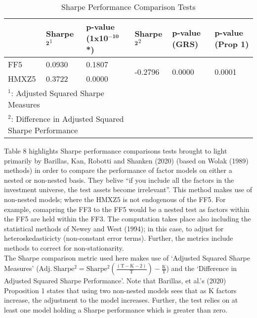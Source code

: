 \documentclass[11pt, english]{article}
\begin{document}
\begin{table}[h]
        \scriptsize
	\renewcommand{\arraystretch}{1.25}
\begin{center}
\begin{tabular}{ p{1.5cm} p{1.5cm} p{1.5cm} | p{1.5cm} p{1.5cm} p{1.5cm} }
        & \textbf{Sharpe}$\mathbf{^2}^1$ & \textbf{p-value (1x10$\mathbf{^{-10}}$*)} & \textbf{Sharpe}$\mathbf{^2}^2$ & \textbf{p-value (GRS)} & \textbf{p-value (Prop 1)}\\
        \hline
        FF5 & 0.0930 & 0.1807 & \multirow{2}{*}{-0.2796} & \multirow{2}{*}{0.0000} & \multirow{2}{*}{0.0001}\\
        HMXZ5 & 0.3722 & 0.0000 & & &\\
        \hline
        \multicolumn{3}{l}{$^1$: Adjusted Squared Sharpe Measures}\\
        \multicolumn{3}{l}{$^2$: Difference in Adjusted Squared Sharpe Performance}\\ 
        \hline
\end{tabular}
        \caption{Sharpe Performance Comparison Tests}
\end{center}
\end{table}

Table 8 highlights Sharpe performance comparisons tests brought to light primarily by Barillas, Kan, Robotti and Shanken (2020) (based on Wolak (1989) methods) in order to compare the performance of factor models on either a nested or non-nested basis. They belive ``if you include all the factors in the investment universe, the test assets become irrelevant''. This method makes use of non-nested models; where the HMXZ5 is not endogenous of the FF5. For example, comapring the FF3 to the FF5 would be a nested test as factors within the FF5 are held within the FF3. The computation takes place also including the statistical methods of Newey and West (1994); in this case, to adjust for heteroskedasticicty (non-constant error terms). Further, the metrics include methods to correct for non-stationarity.\\

The Sharpe comparison metric used here makes use of `Adjusted Squared Sharpe Measures' ($\mathrm{Adj.\ Sharpe^2=Sharpe^2\left(\frac{(T-K-2)}{T}\right)-\frac{K}{T}}$) and the `Difference in Adjusted Squared Sharpe Performance'. Note that Barillas, et al.'s (2020) Proposition 1 states that using two non-nested models sees that as K factors increase, the adjustment to the model increases. Further, the test relies on at least one model holding a Sharpe performance which is greater than zero.
\end{document}
